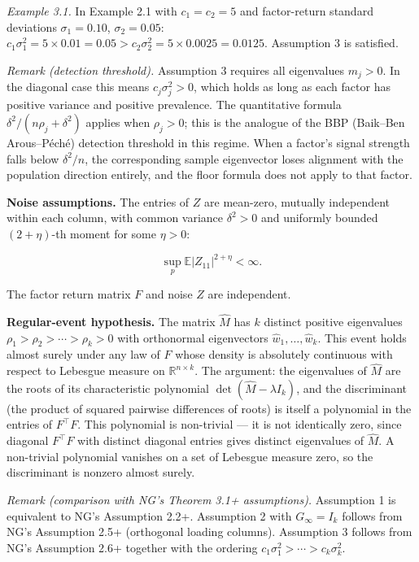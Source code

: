 \documentclass{article}
\theoremstyle{remark}
\begin{document}
\textit{Example 3.1.} In Example 2.1 with $c_1 = c_2 = 5$ and factor-return standard deviations $\sigma_1 = 0.10$, $\sigma_2 = 0.05$: $c_1\sigma_1^2 = 5\times 0.01 = 0.05 > c_2\sigma_2^2 = 5\times 0.0025 = 0.0125$. Assumption 3 is satisfied.

\textit{Remark (detection threshold).} Assumption 3 requires all eigenvalues $m_j > 0$. In the diagonal case this means $c_j\sigma_j^2 > 0$, which holds as long as each factor has positive variance and positive prevalence. The quantitative formula $\delta^2/(n\rho_j+\delta^2)$ applies when $\rho_j > 0$; this is the analogue of the BBP (Baik–Ben Arous–Péché) detection threshold in this regime. When a factor's signal strength falls below $\delta^2/n$, the corresponding sample eigenvector loses alignment with the population direction entirely, and the floor formula does not apply to that factor.

\textbf{Noise assumptions.} The entries of $Z$ are mean-zero, mutually independent within each column, with common variance $\delta^2 > 0$ and uniformly bounded $(2+\eta)$-th moment for some $\eta > 0$:

\[
\sup_p \mathbb{E}|Z_{11}|^{2+\eta} < \infty.
\]

The factor return matrix $F$ and noise $Z$ are independent.

\textbf{Regular-event hypothesis.} The matrix $\hat{M}$ has $k$ distinct positive eigenvalues $\rho_1 > \rho_2 > \cdots > \rho_k > 0$ with orthonormal eigenvectors $\hat{w}_1,\ldots,\hat{w}_k$. This event holds almost surely under any law of $F$ whose density is absolutely continuous with respect to Lebesgue measure on $\mathbb{R}^{n\times k}$. The argument: the eigenvalues of $\hat{M}$ are the roots of its characteristic polynomial $\det(\hat{M} - \lambda I_k)$, and the discriminant (the product of squared pairwise differences of roots) is itself a polynomial in the entries of $F^\top F$. This polynomial is non-trivial — it is not identically zero, since diagonal $F^\top F$ with distinct diagonal entries gives distinct eigenvalues of $\hat{M}$. A non-trivial polynomial vanishes on a set of Lebesgue measure zero, so the discriminant is nonzero almost surely.

\textit{Remark (comparison with NG's Theorem 3.1+ assumptions).} Assumption 1 is equivalent to NG's Assumption 2.2+. Assumption 2 with $G_\infty = I_k$ follows from NG's Assumption 2.5+ (orthogonal loading columns). Assumption 3 follows from NG's Assumption 2.6+ together with the ordering $c_1\sigma_1^2 > \cdots > c_k\sigma_k^2$.
\end{document}
